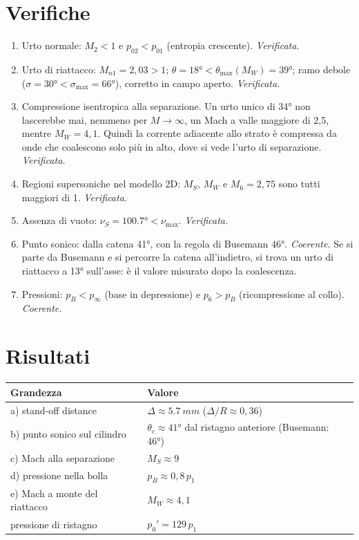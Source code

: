 \documentclass[11pt,a4paper]{article}
\begin{document}
\section{Verifiche}
\begin{enumerate}
\item Urto normale: $M_2<1$ e $p_{02}<p_{01}$ (entropia crescente). \emph{Verificata.}
\item Urto di riattacco: $M_{n1}=2{,}03>1$; $\theta=\ang{18}<\theta_{\max}(M_W)=\ang{39}$; ramo debole
  ($\sigma=\ang{30}<\sigma_{\max}=\ang{66}$), corretto in campo aperto. \emph{Verificata.}
\item Compressione isentropica alla separazione. Un urto unico di \ang{34} non lascerebbe mai, nemmeno per
  $M\to\infty$, un Mach a valle maggiore di 2,5, mentre $M_W=4{,}1$. Quindi la corrente adiacente allo strato è
  compressa da onde che coalescono solo più in alto, dove si vede l'urto di separazione. \emph{Verificata.}
\item Regioni supersoniche nel modello 2D: $M_S$, $M_W$ e $M_6=2{,}75$ sono tutti maggiori di 1. \emph{Verificata.}
\item Assenza di vuoto: $\nu_S=\ang{100.7}<\nu_{\max}$. \emph{Verificata.}
\item Punto sonico: dalla catena \ang{41}, con la regola di Busemann \ang{46}. \emph{Coerente.} Se si parte da
  Busemann e si percorre la catena all'indietro, si trova un urto di riattacco a \ang{13} sull'asse: è il valore
  misurato dopo la coalescenza.
\item Pressioni: $p_B<p_\infty$ (base in depressione) e $p_6>p_B$ (ricompressione al collo). \emph{Coerente.}
\end{enumerate}

\section{Risultati}
\begin{table}[H]
  \centering
  \begin{tabular}{ll}
    \toprule
    Grandezza & Valore \\
    \midrule
    a) stand-off distance & $\Delta\approx\SI{5.7}{mm}$ ($\Delta/R\approx0{,}36$) \\
    b) punto sonico sul cilindro & $\theta_c\approx\ang{41}$ dal ristagno anteriore (Busemann: \ang{46}) \\
    c) Mach alla separazione & $M_S\approx9$ \\
    d) pressione nella bolla & $p_B\approx0{,}8\,p_1$ \\
    e) Mach a monte del riattacco & $M_W\approx4{,}1$ \\
    \midrule
    pressione di ristagno & $p_0'=129\,p_1$ \\
    \bottomrule
  \end{tabular}
\end{table}
\end{document}
